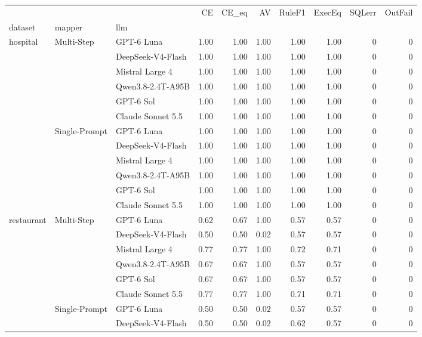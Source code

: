 \begin{tabular}{lllrrrrrrr}
\toprule
 &  &  & CE & CE_eq & AV & RuleF1 & ExecEq & SQLerr & OutFail \\
dataset & mapper & llm &  &  &  &  &  &  &  \\
\midrule
\multirow[t]{12}{*}{hospital} & \multirow[t]{6}{*}{Multi-Step} & GPT-6 Luna & 1.00 & 1.00 & 1.00 & 1.00 & 1.00 & 0 & 0 \\
 &  & DeepSeek-V4-Flash & 1.00 & 1.00 & 1.00 & 1.00 & 1.00 & 0 & 0 \\
 &  & Mistral Large 4 & 1.00 & 1.00 & 1.00 & 1.00 & 1.00 & 0 & 0 \\
 &  & Qwen3.8-2.4T-A95B & 1.00 & 1.00 & 1.00 & 1.00 & 1.00 & 0 & 0 \\
 &  & GPT-6 Sol & 1.00 & 1.00 & 1.00 & 1.00 & 1.00 & 0 & 0 \\
 &  & Claude Sonnet 5.5 & 1.00 & 1.00 & 1.00 & 1.00 & 1.00 & 0 & 0 \\
\cline{2-10}
 & \multirow[t]{6}{*}{Single-Prompt} & GPT-6 Luna & 1.00 & 1.00 & 1.00 & 1.00 & 1.00 & 0 & 0 \\
 &  & DeepSeek-V4-Flash & 1.00 & 1.00 & 1.00 & 1.00 & 1.00 & 0 & 0 \\
 &  & Mistral Large 4 & 1.00 & 1.00 & 1.00 & 1.00 & 1.00 & 0 & 0 \\
 &  & Qwen3.8-2.4T-A95B & 1.00 & 1.00 & 1.00 & 1.00 & 1.00 & 0 & 0 \\
 &  & GPT-6 Sol & 1.00 & 1.00 & 1.00 & 1.00 & 1.00 & 0 & 0 \\
 &  & Claude Sonnet 5.5 & 1.00 & 1.00 & 1.00 & 1.00 & 1.00 & 0 & 0 \\
\cline{1-10} \cline{2-10}
\multirow[t]{12}{*}{restaurant} & \multirow[t]{6}{*}{Multi-Step} & GPT-6 Luna & 0.62 & 0.67 & 1.00 & 0.57 & 0.57 & 0 & 0 \\
 &  & DeepSeek-V4-Flash & 0.50 & 0.50 & 0.02 & 0.57 & 0.57 & 0 & 0 \\
 &  & Mistral Large 4 & 0.77 & 0.77 & 1.00 & 0.72 & 0.71 & 0 & 0 \\
 &  & Qwen3.8-2.4T-A95B & 0.67 & 0.67 & 1.00 & 0.57 & 0.57 & 0 & 0 \\
 &  & GPT-6 Sol & 0.67 & 0.67 & 1.00 & 0.57 & 0.57 & 0 & 0 \\
 &  & Claude Sonnet 5.5 & 0.77 & 0.77 & 1.00 & 0.71 & 0.71 & 0 & 0 \\
\cline{2-10}
 & \multirow[t]{6}{*}{Single-Prompt} & GPT-6 Luna & 0.50 & 0.50 & 0.02 & 0.57 & 0.57 & 0 & 0 \\
 &  & DeepSeek-V4-Flash & 0.50 & 0.50 & 0.02 & 0.62 & 0.57 & 0 & 0 \\

\end{tabular}
